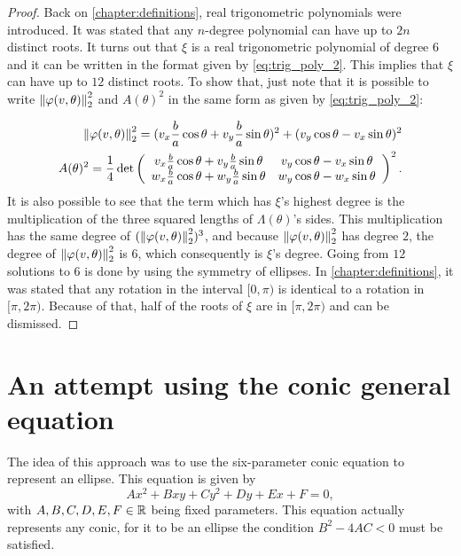 \begin{proof}
	
Back on \autoref{chapter:definitions}, real trigonometric polynomials were introduced. It was stated that any $n$-degree polynomial can have up to $2n$ distinct roots. It turns out that $\xi$ is a real trigonometric polynomial of degree $6$ and it can be written in the format given by \autoref{eq:trig_poly_2}. This implies that $\xi$ can have up to $12$ distinct roots.
 To show that, just note that it is possible to write $\left\lVert\varphi(v, \theta)\right\rVert_{2}^2$ and $A(\theta)^2$ in the same form as given by \autoref{eq:trig_poly_2}:
 
 \begin{align}\label{eq:dd}
 	\left\lVert\varphi(v, \theta)\right\rVert_{2}^2 = (v_x\frac{b}{a}\cos\theta + v_y\frac{b}{a}\sin\theta)^2 + (v_y\cos\theta - v_x\sin\theta)^2\\
 	\label{eq:dd2} A(\theta)^2=\dfrac{1}{4}\det\left(
 	\begin{array}{cc}
 		v_x\frac{b}{a}\cos\theta + v_y\frac{b}{a}\sin\theta&v_y\cos\theta - v_x\sin\theta\\
 		w_x\frac{b}{a}\cos\theta + w_y\frac{b}{a}\sin\theta&w_y\cos\theta - w_x\sin\theta
 	\end{array}\right)^2.
 \end{align}
  It is also possible to see that the term which has $\xi$'s highest degree is the multiplication of the three squared lengths of $\Lambda(\theta)$'s sides. This multiplication has the same degree of $(\left\lVert\varphi(v, \theta)\right\rVert_{2}^2)^3$, and because $\left\lVert\varphi(v, \theta)\right\rVert_{2}^2$ has degree $2$, the degree of $\left\lVert\varphi(v, \theta)\right\rVert_{2}^2$ is $6$, which consequently is $\xi$'s degree.
Going from $12$ solutions to $6$ is done by using the symmetry of ellipses. In \autoref{chapter:definitions}, it was stated that any rotation in the interval $[0, \pi)$ is identical to a rotation in $[\pi, 2\pi)$. Because of that, half of the roots of $\xi$ are in $[\pi, 2\pi)$ and can be dismissed.
\end{proof}

\section{An attempt using the conic general equation}

The idea of this approach was to use the six-parameter conic equation to represent an ellipse. This equation is given by
\begin{equation}\label{eq:gen_ellipse}
Ax^2+Bxy+Cy^2+Dy+Ex+F=0,
\end{equation}
with $A, B, C, D, E,F \in \mathbb{R}$ being fixed parameters.
This equation actually represents any conic, for it to be an ellipse the condition $B^2 -4AC < 0$ must be satisfied.

